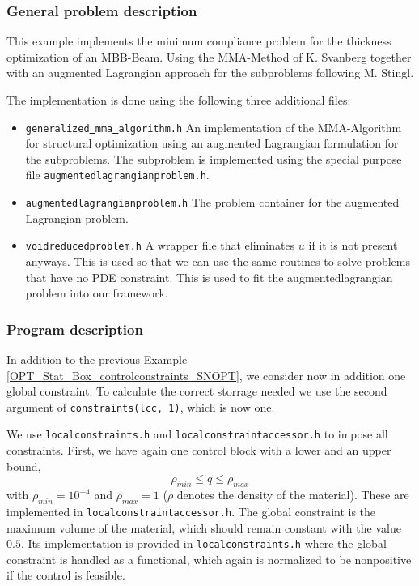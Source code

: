 \subsubsection{General problem description}
This example implements the minimum compliance problem for the thickness optimization 
of an MBB-Beam. Using the MMA-Method of K. Svanberg together with an augmented Lagrangian 
approach for the subproblems following M. Stingl.

The implementation is done using the following three additional files:

\begin{itemize}
\item \texttt{generalized\underline{ }mma\underline{ }algorithm.h}
  An implementation of the MMA-Algorithm for structural optimization using an augmented
  Lagrangian formulation for the subproblems. The subproblem is implemented using the 
  special purpose\\ file \texttt{augmentedlagrangianproblem.h}.
\item \texttt{augmentedlagrangianproblem.h} The problem container 
  for the augmented Lagrangian problem.
\item \texttt{voidreducedproblem.h} A wrapper file that eliminates $u$ 
  if it is not present anyways. This is used so that we can use the same routines to 
  solve problems that have no PDE constraint. This is used to fit the augmentedlagrangian 
  problem into our framework.
\end{itemize}


\subsubsection{Program description}
In addition to the previous Example \ref{OPT_Stat_Box_controlconstraints_SNOPT}, 
we consider now in addition one global constraint. To calculate the correct 
storrage needed we use the 
second argument of \texttt{constraints(lcc, 1)}, which is now one. 

We use 
\texttt{localconstraints.h} and \texttt{localconstraintaccessor.h} to impose 
all constraints. First, we have again one control block with a lower and 
an upper bound, 
\[
\rho_{min} \leq q \leq \rho_{max}
\]
with $\rho_{min} = 10^{-4}$ and $\rho_{max} = 1$ ($\rho$ denotes the density
of the material). These are implemented in \texttt{localconstraintaccessor.h}.
The global constraint is the maximum volume of the material,
which should remain constant with the value $0.5$. Its implementation is 
provided in \texttt{localconstraints.h} where the global constraint is handled as 
a functional, which again is normalized to be nonpositive if the control is feasible.

